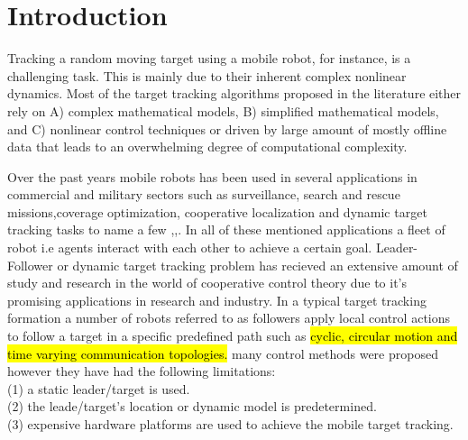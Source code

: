 \documentclass[conference]{IEEEtran}
\begin{document}

\section{Introduction}
\label{sec:introduction}

Tracking a random moving target using a mobile robot, for instance, is a challenging task. This is mainly due to their inherent complex nonlinear dynamics. Most of the target tracking algorithms proposed in the literature either rely on A) complex mathematical models, B) simplified mathematical models, and C) nonlinear control techniques or driven by large amount of mostly offline data that leads to an overwhelming degree of computational complexity.


Over the past years mobile robots has been used in several applications in commercial and military sectors such as surveillance, search and rescue missions,coverage optimization, cooperative localization and dynamic target tracking tasks to name a few \cite{kolling2006},\cite{Encarnacao2001},\cite{Ju2001}.  In all of these mentioned applications a fleet of robot i.e agents interact with each other to achieve a certain goal. Leader-Follower or dynamic target tracking problem has recieved an extensive amount of study and research in the world of cooperative control theory due to it's promising applications in research and industry. In a typical target tracking formation a number of robots referred to as followers apply local control actions to follow a target in a specific predefined path such as \hl {cyclic, circular motion and time varying communication topologies.} many control methods were proposed however they have had the following limitations:
\\(1) a static leader/target is used.
\\(2) the leade/target's location or dynamic model is predetermined.  
\\(3) expensive hardware platforms are used to achieve the mobile target tracking. 
\end{document}
